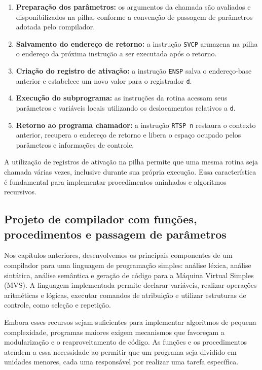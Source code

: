 \documentclass[
  brazilian,
  letterpaper,
]{book}
\providecommand{\tightlist}{%
  \setlength{\itemsep}{0pt}\setlength{\parskip}{0pt}}
\theoremstyle{plain}
\theoremstyle{definition}
\theoremstyle{remark}
\begin{document}
\begin{enumerate}
\def\labelenumi{\arabic{enumi}.}
\tightlist
\item
  \textbf{Preparação dos parâmetros:} os argumentos da chamada são
  avaliados e disponibilizados na pilha, conforme a convenção de
  passagem de parâmetros adotada pelo compilador.
\item
  \textbf{Salvamento do endereço de retorno:} a instrução \texttt{SVCP}
  armazena na pilha o endereço da próxima instrução a ser executada após
  o retorno.
\item
  \textbf{Criação do registro de ativação:} a instrução \texttt{ENSP}
  salva o endereço-base anterior e estabelece um novo valor para o
  registrador \texttt{d}.
\item
  \textbf{Execução do subprograma:} as instruções da rotina acessam seus
  parâmetros e variáveis locais utilizando os deslocamentos relativos a
  \texttt{d}.
\item
  \textbf{Retorno ao programa chamador:} a instrução \texttt{RTSP\ n}
  restaura o contexto anterior, recupera o endereço de retorno e libera
  o espaço ocupado pelos parâmetros e informações de controle.
\end{enumerate}

A utilização de registros de ativação na pilha permite que uma mesma
rotina seja chamada várias vezes, inclusive durante sua própria
execução. Essa característica é fundamental para implementar
procedimentos aninhados e algoritmos recursivos.

\subsection{Projeto de compilador com funções, procedimentos e passagem
de
parâmetros}\label{projeto-de-compilador-com-funuxe7uxf5es-procedimentos-e-passagem-de-paruxe2metros}

Nos capítulos anteriores, desenvolvemos os principais componentes de um
compilador para uma linguagem de programação simples: análise léxica,
análise sintática, análise semântica e geração de código para a Máquina
Virtual Simples (MVS). A linguagem implementada permite declarar
variáveis, realizar operações aritméticas e lógicas, executar comandos
de atribuição e utilizar estruturas de controle, como seleção e
repetição.

Embora esses recursos sejam suficientes para implementar algoritmos de
pequena complexidade, programas maiores exigem mecanismos que favoreçam
a modularização e o reaproveitamento de código. As funções e os
procedimentos atendem a essa necessidade ao permitir que um programa
seja dividido em unidades menores, cada uma responsável por realizar uma
tarefa específica.
\end{document}

